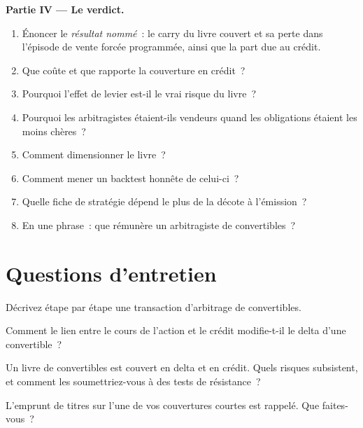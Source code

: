 \begin{problem}
\medskip\noindent\textbf{Partie IV --- Le verdict.}
\begin{enumerate}[resume]
\item Énoncer le \emph{résultat nommé}~: le carry du livre couvert et sa perte dans l'épisode de vente forcée programmée, ainsi que la part due au crédit.
\item Que coûte et que rapporte la couverture en crédit~?
\item Pourquoi l'effet de levier est-il le vrai risque du livre~?
\item Pourquoi les arbitragistes étaient-ils vendeurs quand les obligations étaient les moins chères~?
\item Comment dimensionner le livre~?
\item Comment mener un backtest honnête de celui-ci~?
\item Quelle fiche de stratégie dépend le plus de la décote à l'émission~?
\item En une phrase~: que rémunère un arbitragiste de convertibles~?
\end{enumerate}
\end{problem}

\section{Questions d'entretien}

\begin{interviewq}\label{iq:s2:convertible-arbitrage:1}
Décrivez étape par étape une transaction d'arbitrage de convertibles.
\end{interviewq}

\begin{interviewq}\label{iq:s2:convertible-arbitrage:2}
Comment le lien entre le cours de l'action et le crédit modifie-t-il le delta d'une convertible~?
\end{interviewq}

\begin{interviewq}\label{iq:s2:convertible-arbitrage:3}
Un livre de convertibles est couvert en delta et en crédit. Quels risques subsistent, et comment les soumettriez-vous à des tests de résistance~?
\end{interviewq}

\begin{interviewq}\label{iq:s2:convertible-arbitrage:4}
L'emprunt de titres sur l'une de vos couvertures courtes est rappelé. Que faites-vous~?
\end{interviewq}

